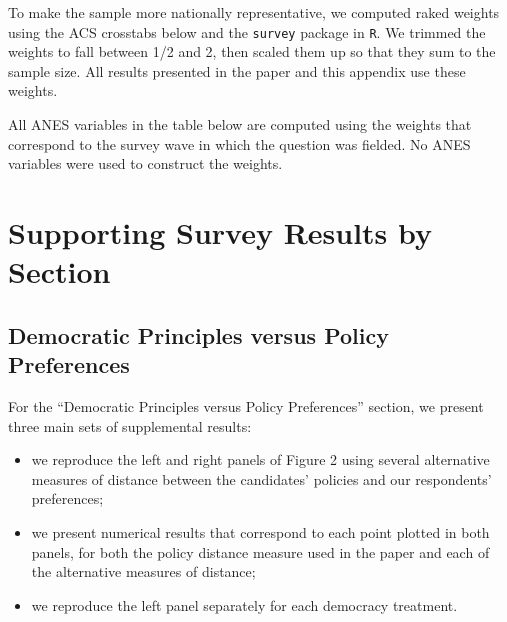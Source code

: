\documentclass[12pt]{article}
\begin{document}
To make the sample more nationally representative, we computed raked weights using the ACS crosstabs below and the \texttt{survey} package in \texttt{R}. We trimmed the weights to fall between 1/2 and 2, then scaled them up so that they sum to the sample size. All results presented in the paper and this appendix use these weights. 

All ANES variables in the table below are computed using the weights that correspond to the survey wave in which the question was fielded. No ANES variables were used to construct the weights.

\singlespacing




\clearpage
\newpage





\section{Supporting Survey Results by Section}
\setcounter{figure}{0} 
\setcounter{table}{0} 

\subsection{Democratic Principles versus Policy Preferences}

For the ``Democratic Principles versus Policy Preferences'' section, we present three main sets of supplemental results:

\begin{itemize}
\item we reproduce the left and right panels of Figure 2 using several alternative measures of distance between the candidates' policies and our respondents' preferences;
\item we present numerical results that correspond to each point plotted in both panels, for both the policy distance measure used in the paper and each of the alternative measures of distance;
\item we reproduce the left panel separately for each democracy treatment.
\end{itemize}
\end{document}
